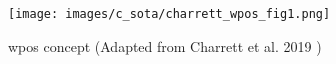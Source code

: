         \begin{figure}
            \centering
            \texttt{[image: images/c\_sota/charrett\_wpos\_fig1.png]}
            \caption{\gls{wpos} concept (Adapted from Charrett et al. 2019 \cite{charrett_wpos})}
            \label{fig:charrett_wpos_fig1.png}
        \end{figure}
        
                

                
                

\clearpage